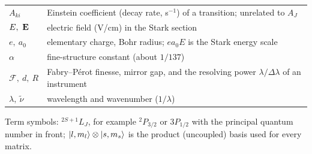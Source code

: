 \begin{center}
\begin{tabular}{p{2.6cm}p{11cm}}
$A_{ki}$ & Einstein coefficient (decay rate, s$^{-1}$) of a transition; unrelated to $A_J$\\
$E,\ \vb E$ & electric field (V/cm) in the Stark section\\
$e,\ a_0$ & elementary charge, Bohr radius; $e a_0 E$ is the Stark energy scale\\
$\alpha$ & fine-structure constant (about $1/137$)\\
$\mathcal F,\ d,\ R$ & Fabry--P\'erot finesse, mirror gap, and the resolving power $\lambda/\Delta\lambda$ of an instrument\\
$\lambda,\ \tilde\nu$ & wavelength and wavenumber ($1/\lambda$)\\
\bottomrule
\end{tabular}
\end{center}
Term symbols: $^{2S+1}L_J$, for example $^2P_{3/2}$ or $3P_{1/2}$ with the principal quantum number in front; $\ket{l,m_l}\otimes\ket{s,m_s}$ is the product (uncoupled) basis used for every matrix.
